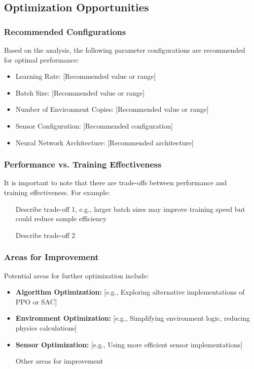 \subsection{Optimization Opportunities}

\subsubsection{Recommended Configurations}
Based on the analysis, the following parameter configurations are recommended for optimal performance:
\begin{itemize}
    \item Learning Rate: [Recommended value or range]
    \item Batch Size: [Recommended value or range]
    \item Number of Environment Copies: [Recommended value or range]
    \item Sensor Configuration: [Recommended configuration]
    \item Neural Network Architecture: [Recommended architecture]
\end{itemize}

\subsubsection{Performance vs. Training Effectiveness}
It is important to note that there are trade-offs between performance and training effectiveness. For example:
\begin{itemize}
    \item [Describe trade-off 1, e.g., larger batch sizes may improve training speed but could reduce sample efficiency]
    \item [Describe trade-off 2]
\end{itemize}

\subsubsection{Areas for Improvement}
Potential areas for further optimization include:
\begin{itemize}
    \item \textbf{Algorithm Optimization:} [e.g., Exploring alternative implementations of PPO or SAC]
    \item \textbf{Environment Optimization:} [e.g., Simplifying environment logic, reducing physics calculations]
    \item \textbf{Sensor Optimization:} [e.g., Using more efficient sensor implementations]
    \item [Other areas for improvement]
\end{itemize}